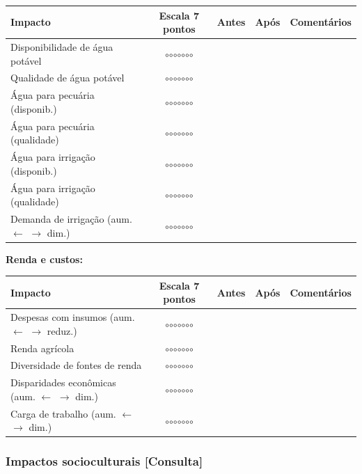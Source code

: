 {
\begin{longtable}[]{@{}lcccl@{}}
\toprule\noalign{}
Impacto & Escala 7 pontos & Antes & Após & Comentários \\
\midrule\noalign{}
\endhead
\bottomrule\noalign{}
\endlastfoot
Disponibilidade de água potável & $\circ$$\circ$$\circ$$\circ$$\circ$$\circ$$\circ$ & & & \\
Qualidade de água potável & $\circ$$\circ$$\circ$$\circ$$\circ$$\circ$$\circ$ & & & \\
Água para pecuária (disponib.) & $\circ$$\circ$$\circ$$\circ$$\circ$$\circ$$\circ$ & & & \\
Água para pecuária (qualidade) & $\circ$$\circ$$\circ$$\circ$$\circ$$\circ$$\circ$ & & & \\
Água para irrigação (disponib.) & $\circ$$\circ$$\circ$$\circ$$\circ$$\circ$$\circ$ & & & \\
Água para irrigação (qualidade) & $\circ$$\circ$$\circ$$\circ$$\circ$$\circ$$\circ$ & & & \\
Demanda de irrigação (aum. $\leftarrow$ $\rightarrow$ dim.) & $\circ$$\circ$$\circ$$\circ$$\circ$$\circ$$\circ$ & & & \\
\end{longtable}
}

\textbf{Renda e custos:}

{
\begin{longtable}[]{@{}lcccl@{}}
\toprule\noalign{}
Impacto & Escala 7 pontos & Antes & Após & Comentários \\
\midrule\noalign{}
\endhead
\bottomrule\noalign{}
\endlastfoot
Despesas com insumos (aum. $\leftarrow$ $\rightarrow$ reduz.) & $\circ$$\circ$$\circ$$\circ$$\circ$$\circ$$\circ$ & & & \\
Renda agrícola & $\circ$$\circ$$\circ$$\circ$$\circ$$\circ$$\circ$ & & & \\
Diversidade de fontes de renda & $\circ$$\circ$$\circ$$\circ$$\circ$$\circ$$\circ$ & & & \\
Disparidades econômicas (aum. $\leftarrow$ $\rightarrow$ dim.) & $\circ$$\circ$$\circ$$\circ$$\circ$$\circ$$\circ$ & & & \\
Carga de trabalho (aum. $\leftarrow$ $\rightarrow$ dim.) & $\circ$$\circ$$\circ$$\circ$$\circ$$\circ$$\circ$ & & & \\
\end{longtable}
}

\subsubsection{Impactos socioculturais {[Consulta]}}\label{impactos-socioculturais}


